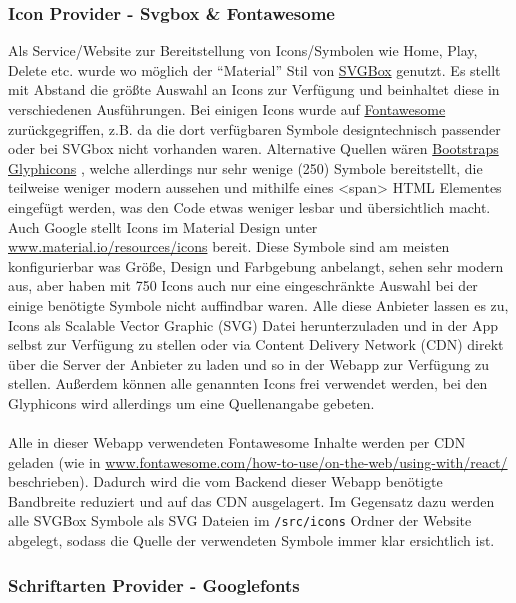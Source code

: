 \subsubsection{Icon Provider - Svgbox \& Fontawesome} \label{icons}

Als Service/Website zur Bereitstellung von Icons/Symbolen wie Home, Play, Delete etc. wurde wo möglich der ``Material'' Stil von \href{www.svgbox.net}{SVGBox} \cite{svgbox} genutzt. Es stellt mit Abstand die größte Auswahl an Icons zur Verfügung und beinhaltet diese in verschiedenen Ausführungen. Bei einigen Icons wurde auf \href{www.fontawesome.com}{Fontawesome} \cite{fontawesome} zurückgegriffen, z.B. da die dort verfügbaren Symbole designtechnisch passender oder bei SVGbox nicht vorhanden waren. Alternative Quellen wären \href{www.getbootstrap.com/docs/3.3/components/}{Bootstraps Glyphicons} \cite{glyphicons}, welche allerdings nur sehr wenige (250) Symbole bereitstellt, die teilweise weniger modern aussehen und mithilfe eines <span> HTML Elementes eingefügt werden, was den Code etwas weniger lesbar und übersichtlich macht. Auch Google stellt Icons im Material Design unter \url{www.material.io/resources/icons} \cite{material-icons} bereit. Diese Symbole sind am meisten konfigurierbar was Größe, Design und Farbgebung anbelangt, sehen sehr modern aus, aber haben mit 750 Icons auch nur eine eingeschränkte Auswahl bei der einige benötigte Symbole nicht auffindbar waren. Alle diese Anbieter lassen es zu, Icons als Scalable Vector Graphic (SVG) Datei herunterzuladen und in der App selbst zur Verfügung zu stellen oder via  Content Delivery Network (CDN) direkt über die Server der Anbieter zu laden und so in der Webapp zur Verfügung zu stellen. Außerdem können alle genannten Icons frei verwendet werden, bei den Glyphicons wird allerdings um eine Quellenangabe gebeten.
\\
\\
Alle in dieser Webapp verwendeten Fontawesome Inhalte werden per CDN geladen (wie in \linebreak\url{www.fontawesome.com/how-to-use/on-the-web/using-with/react/} beschrieben). Dadurch wird die vom Backend dieser Webapp benötigte Bandbreite reduziert und auf das CDN ausgelagert. Im Gegensatz dazu werden alle SVGBox Symbole als SVG Dateien im \texttt{/src/icons} Ordner der Website abgelegt, sodass die Quelle der verwendeten Symbole immer klar ersichtlich ist.

\subsubsection{Schriftarten Provider - Googlefonts}

